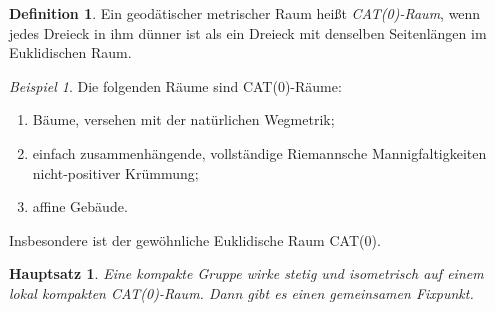 \documentclass[a4paper,10pt]{article}
\theoremstyle{definition}
\newtheorem{defi}[equation]{Definition}
\theoremstyle{remark}
\newtheorem{bsp}[equation]{Beispiel}
\theoremstyle{plain}
\newtheorem{hpts}[equation]{Hauptsatz}
\begin{document}
    \begin{defi}
        Ein geod\"atischer metrischer Raum hei{\ss}t \textit{CAT(0)-Raum}, wenn jedes Dreieck
        in ihm d\"unner ist als ein Dreieck mit denselben Seitenl\"angen im Euklidischen Raum.
    \end{defi}

    \begin{bsp}
        Die folgenden R\"aume sind
        CAT(0)-R\"aume:\begin{enumerate}
                \item B\"aume, versehen mit der nat\"urlichen
                Wegmetrik;
                \item einfach zusammenh\"angende, vollst\"andige Riemannsche Mannigfaltigkeiten
                nicht-positiver Kr\"ummung;
                \item affine Geb\"aude.

        \end{enumerate}
        Insbesondere ist der gew\"ohnliche Euklidische Raum CAT(0).
    \end{bsp}

    \begin{hpts}
        Eine kompakte Gruppe wirke stetig und isometrisch auf einem lokal kompakten CAT(0)-Raum.
        Dann gibt es einen gemeinsamen Fixpunkt.
    \end{hpts}
\end{document}
